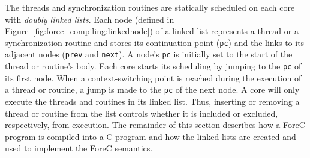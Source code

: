 The threads and synchronization routines are statically 
scheduled on each core with \emph{doubly linked lists}. 
Each node (defined in Figure~\ref{fig:forec_compiling:linkednode}) 
of a linked list represents a thread or a synchronization
routine and stores its continuation point (\verb$pc$) and
the links to its adjacent nodes (\verb$prev$ and
\verb$next$). A node's \verb$pc$ is initially set to the
start of the thread or routine's body. Each core starts its
scheduling by jumping to the \verb$pc$ of its first node.
When a context-switching point is reached during the
execution of a thread or routine, a jump is made to the
\verb$pc$ of the next node. A core will only execute the
threads and routines in its linked list. Thus, inserting or
removing a thread or routine from the list controls whether
it is included or excluded, respectively, from execution. 
The remainder of this section describes how a ForeC program is
compiled into a C program and how the linked lists are created
and used to implement the ForeC semantics. 



